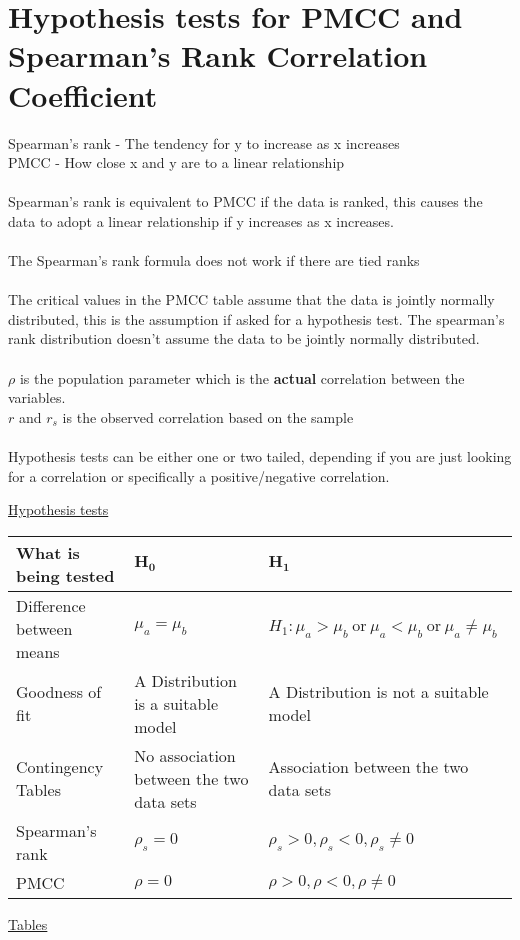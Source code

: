 \documentclass{article}[18pt]
\begin{document}
\section{Hypothesis tests for PMCC and Spearman's Rank Correlation Coefficient}
Spearman's rank - The tendency for y to increase as x increases\\
PMCC - How close x and y are to a linear relationship\\
\\
Spearman's rank is equivalent to PMCC if the data is ranked, this causes the data to adopt a linear relationship if y increases as x increases.\\
\\
The Spearman's rank formula does not work if there are tied ranks\\
\\
The critical values in the PMCC table assume that the data is jointly normally distributed, this is the assumption if asked for a hypothesis test. The spearman's rank distribution doesn't assume the data to be jointly normally distributed.\\
\\
$\rho$ is the population parameter which is the \textbf{actual} correlation between the variables.\\
$r$ and $r_s$ is the observed correlation based on the sample\\
\\
Hypothesis tests can be either one or two tailed, depending if you are just looking for a correlation or specifically a positive/negative correlation.
\newpage
\begin{center}
\underline{\huge Hypothesis tests}
\end{center}
\begin{tabularx}{\textwidth}{|X|X|X|}
\hline
\textbf{What is being tested}&$\mathbf{H_0}$&$\mathbf{H_1}$\\
\hline
Difference between means&$\mu_a=\mu_b$&$H_1:\mu_a>\mu_b \ \textrm{or} \ 
\mu_a<\mu_b \  \textrm{or} \ 
\mu_a\neq\mu_b$\\
\hline
Goodness of fit&A \underline{\hspace{1cm}} Distribution is a suitable model&A \underline{\hspace{1cm}} Distribution is not a suitable model\\
\hline
Contingency Tables&No association between the two data sets&Association between the two data sets\\
\hline
Spearman's rank&$\rho_s=0$&$\rho_s>0,\rho_s<0,\rho_s\neq0$\\
\hline
PMCC&$\rho=0$&$\rho>0,\rho<0,\rho\neq0$\\
\hline
\end{tabularx}
\begin{center}
\underline{\huge Tables}
\end{center}
\setcounter{section}{6}
\end{document}
